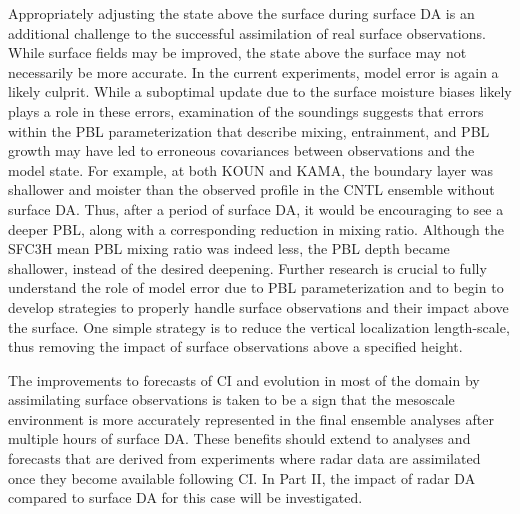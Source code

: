 Appropriately adjusting the state above the surface during surface DA is an additional challenge to the successful assimilation of real surface observations. While surface fields may be improved, the state above the surface may not necessarily be more accurate. In the current experiments, model error is again a likely culprit. While a suboptimal update due to the surface moisture biases likely plays a role in these errors, examination of the soundings suggests that errors within the PBL parameterization that describe mixing, entrainment, and PBL growth may have led to erroneous covariances between observations and the model state. For example, at both KOUN and KAMA, the boundary layer was shallower and moister than the observed profile in the CNTL ensemble without surface DA. Thus, after a period of surface DA, it would be encouraging to see a deeper PBL, along with a corresponding reduction in mixing ratio. Although the SFC3H mean PBL mixing ratio was indeed less, the PBL depth became shallower, instead of the desired deepening. Further research is crucial to fully understand the role of model error due to PBL parameterization and to begin to develop strategies to properly handle surface observations and their impact above the surface. One simple strategy is to reduce the vertical localization length-scale, thus removing the impact of surface observations above a specified height.

The improvements to forecasts of CI and evolution in most of the domain by assimilating surface observations is taken to be a sign that the mesoscale environment is more accurately represented in the final ensemble analyses after multiple hours of surface DA. These benefits should extend to analyses and forecasts that are derived from experiments where radar data are assimilated once they become available following CI. In Part II, the impact of radar DA compared to surface DA for this case will be investigated.
